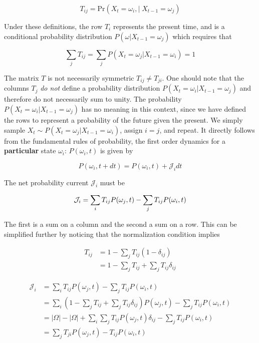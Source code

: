 \documentclass{ucetd}
\begin{document}
\begin{equation*}
T_{ij} = \mathrm{Pr}\left(X_{t}=\omega_{i}, | \;X_{t-1}=\omega_{j}\right)
\end{equation*}

Under these definitions, the row $T_{i}$ represents the present time, and is a conditional  probability distribution $P(\omega | X_{t-1} = \omega_{j})$ which requires that

\begin{equation*}
\sum_{j}T_{ij} = \sum_{j} P(X_{t} = \omega_{j} | X_{t-1} = \omega_{i}) = 1
\end{equation*}

The matrix $T$ is not necessarily symmetric $T_{ij} \neq T_{ji}$. One should note that the columns $T_{j}$ \emph{do not} define a probability distribution $P(X_{t} = \omega_{i} | X_{t-1} = \omega_{j})$ and therefore do not necessarily sum to unity. The probability $P(X_{t} = \omega_{i} | X_{t-1} = \omega_{j})$ has no meaning in this context, since we have defined the rows to represent a probability of the future given the present. We simply sample $X_{t} \sim P(X_{t} = \omega_{j} | X_{t-1} = \omega_{i})$, assign $i=j$, and repeat. It directly follows from the fundamental rules of probability, the first order dynamics for a \textbf{particular} state $\omega_{i}$: $P(\omega_{i},t)$ is given by

\begin{equation}
P(\omega_{i},t+dt) = P(\omega_{i},t) + \mathcal{J}_{i}dt
\end{equation}

The net probability current $\mathcal{J}_{i}$ must be 

\begin{equation*}
\mathcal{J}_{i} = \sum_{i}T_{ij}P(\omega_{j},t) - \sum_{j}T_{ij}P(\omega_{i},t)\\
\end{equation*}

The first is a sum on a column and the second a sum on a row. This can be simplified further by noticing that the normalization condition implies

\begin{align*}
T_{ij} &= 1 - \sum_{j}T_{ij}(1-\delta_{ij})\\
&= 1 - \sum_{j}T_{ij} + \sum_{j}T_{ij}\delta_{ij}
\end{align*}


\begin{align*}
\mathcal{J}_{i} &= \sum_{i}T_{ij}P(\omega_{j},t) - \sum_{j}T_{ij}P(\omega_{i},t)\\
&= \sum_{i}\left(1 - \sum_{j}T_{ij} + \sum_{j}T_{ij}\delta_{ij}\right)P(\omega_{j},t) - \sum_{j}T_{ij}P(\omega_{i},t)\\
&= |\Omega| - |\Omega| + \sum_{i}\sum_{j}T_{ij}P(\omega_{j},t)\delta_{ij} - \sum_{j}T_{ij}P(\omega_{i},t)\\
&= \sum_{j}T_{ji}P(\omega_{j},t) - T_{ij}P(\omega_{i},t)\\
\end{align*}
\end{document}
